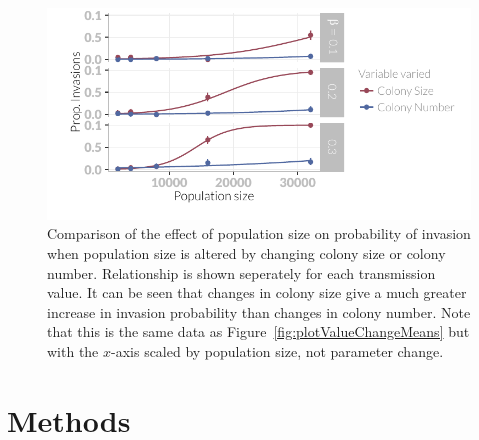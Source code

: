 \begin{knitrout}\footnotesize
{}\color{fgcolor}\begin{figure}[t]

{\centering \includegraphics[width=\textwidth]{figure/plotTransMeans-1} 

}

\caption[Comparison of the probability of invasion when population size is altered by changing colony size or colony number.]{
Comparison of the effect of population size on probability of invasion when population size is altered by changing colony size or colony number.
Relationship is shown seperately for each transmission value.
It can be seen that changes in colony size give a much greater increase in invasion probability than changes in colony number.
Note that this is the same data as Figure~\ref{fig:plotValueChangeMeans} but with the $x$-axis scaled by population size, not parameter change.
}\label{fig:plotTransMeans}
\end{figure}


\end{knitrout}







\section{Methods}






